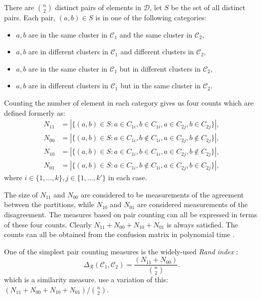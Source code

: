 \documentclass[a4paper]{report}
\newcommand{\dset}{\mathcal{D}}
\newcommand{\clus}{\mathcal{C}}
\newcommand{\partcompare}[1]{\Delta_{\mathcal{#1}}(\clus_1,\clus_2)}
\begin{document}
There are $\binom{n}{2}$ distinct pairs of elements in $\dset$, let $S$ be the
set of all distinct pairs.  Each pair, $(a,b) \in S$ is in one of the
following categories:
\begin{itemize}
\item $a,b$ are in the same cluster in $\clus_1$ and the same cluster in
  $\clus_2$,
\item $a,b$ are in different clusters in $\clus_1$ and different clusters in
  $\clus_2$,
\item $a,b$ are in the same cluster in $\clus_1$ but in different clusters in
  $\clus_2$,
\item $a,b$ are in different clusters in $\clus_1$ but in the same cluster in
  $\clus_2$.
\end{itemize}

Counting the number of element in each category gives us four counts which are
defined formerly as:
\begin{align*}
  N_{11} &= |\{(a,b) \in S \colon
              a \in C_{1i},b \in C_{1i},a \in C_{2j},b \in C_{2j}
            \}|, \\
  N_{00} &= |\{(a,b) \in S \colon
              a \in C_{1i},b \notin C_{1i},a \in C_{2j},b \notin C_{2j}
            \}|, \\
  N_{10} &= |\{(a,b) \in S \colon
              a \in C_{1i},b \in C_{1i},a \in C_{2j},b \notin C_{2j}
            \}|, \\
  N_{01} &= |\{(a,b) \in S \colon
              a \in C_{1i},b \notin C_{1i},a \in C_{2j},b \in C_{2j}
            \}|,
\end{align*}
where $i \in \{1,\dotsc,k\}, j \in \{1,\dotsc,k'\}$ in each case.

The size of $N_{11}$ and $N_{00}$ are considered to be measurements of the
agreement between the partitions, while $N_{10}$ and $N_{01}$ are considered
measurements of the disagreement.  The measures based on pair counting can all
be expressed in terms of these four counts.  Clearly
$N_{11}+N_{00}+N_{10}+N_{01}$ is always satisfied.  The counts can all be
obtained from the confusion matrix in polynomial time
\citep{hubert-arabie-1985}.

One of the simplest pair counting measures is the widely-used \textit{Rand
  index} \citep{rand-1971}:
\begin{equation*}
\partcompare{R} = \frac{(N_{11}+N_{00})}{\binom{n}{2}}.
\end{equation*}
which is a similarity measure.  \citet{hubert-arabie-1985} use a variation of
this: $(N_{11}+N_{00}+N_{10}+N_{01})/\binom{n}{2}$.
\end{document}
